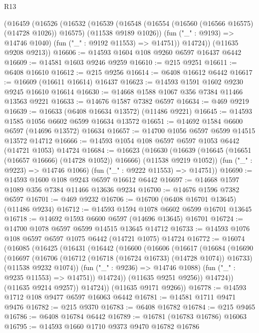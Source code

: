 \begin{lexlean}{R13}
\begin{coremodule}
    (@16459
      (@16526
        (@16532
          (@16539
            (@16548 (@16554 (@16560 (@16566 @16575) (@14728 @1026)) @16575) (@11538 @9189 @1026))
            (fun ("_" : @9193) => @14746 @1040)
            (fun ("_" : @9192 @11553) => @14751))
          @14724))
      (@11635 @9208 @9213))
@16606 := @14593 @1604 @108 @9260 @6597 @16437 @6442
@16609 := @14581 @1603 @9246 @9259
@16610 := @215 @9251
@16611 := @6408 @16610
@16612 := @215 @9256
@16614 := @6408 @16612 @6442
@16617 := @16609 (@16611 @16614) @16437
@16623 := @14593 @1591 @1602 @9230 @9245 @16610 @16614
@16630 := @14668 @1588 @1067 @356 @7384 @11466 @13563 @9221
@16633 := @14676 @1587 @7382 @6597
@16634 := @469 @9219
@16639 := @16633 (@6408 @16634 @13572) (@11486 @9221)
@16645 := @14593 @1585 @1056 @6602 @6599 @16634 @13572
@16651 := @14692 @1584 @6600 @6597 (@14696 @13572) @16634
@16657 := @14700 @1056 @6597 @6599 @14515 @13572 @14712
@16666 := @14593 @1054 @108 @6597 @6597 @1053 @6442 (@14721 @1053) @14724
@16684 := @16623
    (@16630
      (@16639 (@16645 (@16651 (@16657 @16666) (@14728 @1052)) @16666) (@11538 @9219 @1052))
      (fun ("_" : @9223) => @14746 @1066)
      (fun ("_" : @9222 @11553) => @14751))
@16690 := @14593 @1600 @108 @9243 @6597 @16612 @6442
@16697 := @14668 @1597 @1089 @356 @7384 @11466 @13636 @9234
@16700 := @14676 @1596 @7382 @6597
@16701 := @469 @9232
@16706 := @16700 (@6408 @16701 @13645) (@11486 @9234)
@16712 := @14593 @1594 @1078 @6602 @6599 @16701 @13645
@16718 := @14692 @1593 @6600 @6597 (@14696 @13645) @16701
@16724 := @14700 @1078 @6597 @6599 @14515 @13645 @14712
@16733 := @14593 @1076 @108 @6597 @6597 @1075 @6442 (@14721 @1075) @14724
@16772 := @16074
    (@16085
      (@16425
        (@16431
          (@16442
            (@16600
              (@16606
                (@16617
                  (@16684
                    (@16690
                      (@16697
                        (@16706
                          (@16712 (@16718 (@16724 @16733) (@14728 @1074)) @16733)
                          (@11538 @9232 @1074))
                        (fun ("_" : @9236) => @14746 @1088)
                        (fun ("_" : @9235 @11553) => @14751))
                      @14724))
                  (@11635 @9251 @9256))
                @14724))
            (@11635 @9214 @9257))
          @14724))
      (@11635 @9171 @9266))
@16778 := @14593 @1712 @108 @9477 @6597 @16063 @6442
@16781 := @14581 @1711 @9471 @9476
@16782 := @215 @9370
@16783 := @6408 @16782
@16784 := @215 @9465
@16786 := @6408 @16784 @6442
@16789 := @16781 (@16783 @16786) @16063
@16795 := @14593 @1660 @1710 @9373 @9470 @16782 @16786

\end{coremodule}
\end{lexlean}
